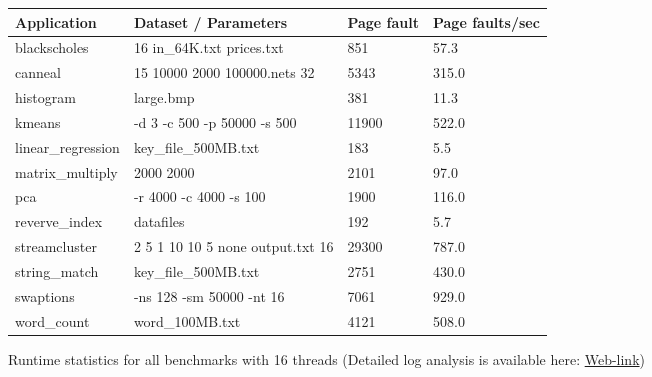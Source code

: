 \begin{figure}[t]
\centering
\myfontsize
{
\begin{tabular}{m{1.6cm}|m{3.2cm}| m{1.2cm}|m{1.2cm}}
   { Application} & Dataset / Parameters & Page fault & Page faults/sec\\
  \hline \hline
    blackscholes& 16 in\_64K.txt prices.txt &851& 57.3 \\
    canneal& 15 10000 2000 100000.nets 32 & 5343& 315.0 \\
    histogram& large.bmp & 381& 11.3  \\
    kmeans& -d 3 -c 500 -p 50000 -s 500 & 11900& 522.0  \\
    linear\_regression& key\_file\_500MB.txt & 183& 5.5  \\
    matrix\_multiply& 2000 2000 & 2101& 97.0  \\
    pca& -r 4000 -c 4000 -s 100 & 1900& 116.0\\
    reverve\_index & datafiles & 192& 5.7  \\
    streamcluster& 2 5 1 10 10 5 none output.txt 16 & 29300& 787.0\\
    string\_match &key\_file\_500MB.txt & 2751& 430.0\\
    swaptions & -ns 128 -sm 50000 -nt 16  & 7061& 929.0 \\
    word\_count& word\_100MB.txt	 & 4121& 508.0  \\

\hline
\end{tabular}
}


\caption{\label{tab:apps} Runtime statistics for all benchmarks with 16 threads (Detailed log analysis is available here: \href{https://mic92.github.io/inspector/index.html\#measurement_table}{Web-link}) }                                                                                                                                  


\end{figure}
